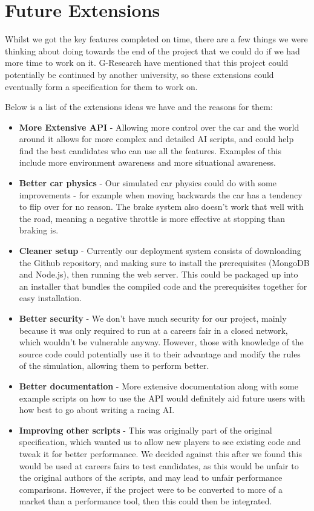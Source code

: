 \section{Future Extensions}

Whilst we got the key features completed on time, there are a few things we were thinking about doing towards the end of the project that we could do if we had more time to work on it. G-Research have mentioned that this project could potentially be continued by another university, so these extensions could eventually form a specification for them to work on.

Below is a list of the extensions ideas we have and the reasons for them:

\begin{itemize}
    \item
        \textbf{More Extensive API} - Allowing more control over the car and the world around it allows for more complex and detailed AI scripts, and could help find the best candidates who can use all the features.  Examples of this include more environment awareness and more situational awareness.
    \item
        \textbf{Better car physics} - Our simulated car physics could do with some improvements - for example when moving backwards the car has a tendency to flip over for no reason. The brake system also doesn't work that well with the road, meaning a negative throttle is more effective at stopping than braking is.
    \item
        \textbf{Cleaner setup} - Currently our deployment system consists of downloading the Github repository, and making sure to install the prerequisites (MongoDB and Node.js), then running the web server. This could be packaged up into an installer that bundles the compiled code and the prerequisites together for easy installation.
    \item
        \textbf{Better security} - We don't have much security for our project, mainly because it was only required to run at a careers fair in a closed network, which wouldn't be vulnerable anyway. However, those with knowledge of the source code could potentially use it to their advantage and modify the rules of the simulation, allowing them to perform better.
    \item
        \textbf{Better documentation} - More extensive documentation along with some example scripts on how to use the API would definitely aid future users with how best to go about writing a racing AI.
    \item
        \textbf{Improving other scripts} - This was originally part of the original specification, which wanted us to allow new players to see existing code and tweak it for better performance. We decided against this after we found this would be used at careers fairs to test candidates, as this would be unfair to the original authors of the scripts, and may lead to unfair performance comparisons. However, if the project were to be converted to more of a market than a performance tool, then this could then be integrated.
\end{itemize}
